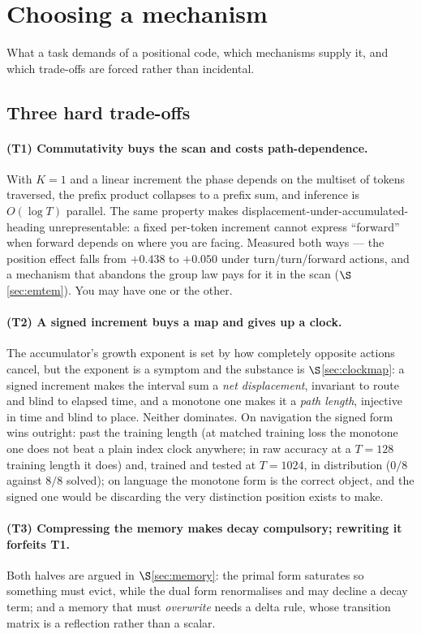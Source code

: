 \documentclass[11pt]{article}
\begin{document}
\section{Choosing a mechanism}
\label{sec:capability}

What
a task demands of a positional code, which mechanisms supply it, and
which trade-offs are forced rather than incidental.

\subsection{Three hard trade-offs}

\paragraph{(T1) Commutativity buys the scan and costs path-dependence.} With $K=1$
and a linear increment the phase depends on the multiset of tokens traversed, the
prefix product collapses to a prefix sum, and inference is $O(\log T)$ parallel. The
same property makes displacement-under-accumulated-heading unrepresentable: a fixed
per-token increment cannot express ``forward'' when forward depends on where you are
facing. Measured both ways --- the position effect falls from $+0.438$ to $+0.050$
under turn/turn/forward actions, and a mechanism that abandons the group law pays for
it in the scan ($\S$\ref{sec:emtem}). You may have one or the other.

\paragraph{(T2) A signed increment buys a map and gives up a clock.} The accumulator's
growth exponent is set by how completely opposite actions cancel, but the
exponent is a symptom and the substance is $\S$\ref{sec:clockmap}:
a signed increment makes the interval sum a \emph{net displacement}, invariant to
route and blind to elapsed time, and a monotone one makes it a \emph{path length},
injective in time and blind to place. Neither dominates. On navigation the signed form
wins outright: past the training length (at matched training loss the monotone one does
not beat a plain index clock anywhere; in raw accuracy at a $T=128$ training length it
does) and, trained and tested at $T=1024$, in distribution ($0/8$ against $8/8$ solved); on language the monotone form is the correct object, and the
signed one would be discarding the very distinction position exists to make.

\paragraph{(T3) Compressing the memory makes decay compulsory; rewriting it forfeits
T1.} Both halves are argued in $\S$\ref{sec:memory}: the primal form saturates so
something must evict, while the dual form renormalises and may decline a decay term;
and a memory that must \emph{overwrite} needs a delta rule, whose transition matrix is
a reflection rather than a scalar.
\end{document}
